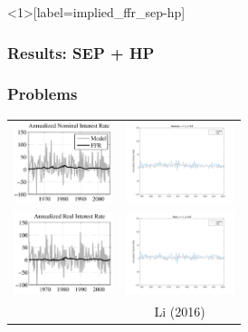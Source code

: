 \documentclass{beamer}
\begin{document}
\begin{frame}<1>[label=implied_ffr_sep-hp]
  \frametitle<1>{Results: SEP + HP}
  \frametitle<2>{Problems}
\begin{center}
\begin{tabular}{cc}
\includegraphics[height=90px]{figs/implied_ffr/nominal_2_collard.png} &
\includegraphics[height=90px]{figs/implied_ffr/nominal_2.png} \\
\includegraphics[height=90px]{figs/implied_ffr/real_2_collard.png} &
\includegraphics[height=90px]{figs/implied_ffr/real_2.png} \\
\cite{collard11} & Li (2016)
\end{tabular}
\end{center}
\end{frame}
\end{document}
